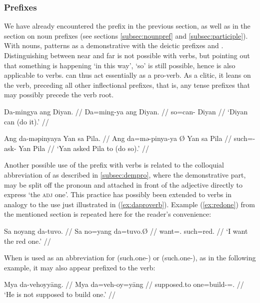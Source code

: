 \subsubsection{Prefixes}

We have already encountered the prefix  in the previous 
section, as well as in the section on noun prefixes (see sections
\ref{subsec:nounpref} and \ref{subsec:participle}). With nouns, 
 patterns as a demonstrative with the deictic prefixes 
 and . Distinguishing between near 
and far is not possible with verbs, but pointing out that something is 
happening `in this way', `so' is still possible, hence  is also 
applicable to verbs.  can thus act essentially as a pro-verb. As 
a clitic, it leans on the verb, preceding all other inflectional prefixes, that 
is, any tense prefixes that may possibly precede the verb root.

\pex\label{ex:daproverb}
\a\begingl
	\gla Da-mingya ang Diyan. //
	\glb Da=ming-ya ang Diyan. //
	\glc so=can-\TsgM{} \Aarg{} Diyan //
	\glft `Diyan can (do it).' //
\endgl

\a\begingl
	\gla Ang da-məpinyaya {} Yan sa Pila. //
	\glb Ang da=mə-pinya-ya Ø Yan sa Pila //
	\glc \AgtT{} such=\Pst{}-ask-\TsgM{} \Top{} Yan \Parg{} Pila //
	\glft `Yan asked Pila to (do so).' //
\endgl

\xe

Another possible use of the prefix  with verbs is related to the 
colloquial abbreviation of  as described in 
\autoref{subsec:dempro}, where the demonstrative part,  may be 
split off the pronoun and attached in front of the adjective directly to 
express `the \textsc{adj} one'. This practice has possibly been extended to 
verbs in analogy to the use just illustrated in (\ref{ex:daproverb}). Example 
(\ref{ex:redone}) from the mentioned section is repeated here for the reader's 
convenience:

\ex\begingl
	\gla Sa noyang da-tuvo. //
	\glb Sa no=yang da=tuvo.Ø //
	\glc \PatT{} want=\Fsg{}.\Aarg{} such=red.\Top{} //
	\glft `I want the red one.' //
\endgl\xe

When  is used as an abbreviation for  
(such.one-\Parg{}) or  (such.one-\PargI{}), as in the 
following example, it may also appear prefixed to the verb:

\ex\begingl
	\gla Mya da-vehoyyāng. //
	\glb Mya da=veh-oy=yāng //
	\glc supposed.to one=build-\Neg{}=\Tsg.\M{} //
	\glft `He is not supposed to build one.' //
\endgl\xe

